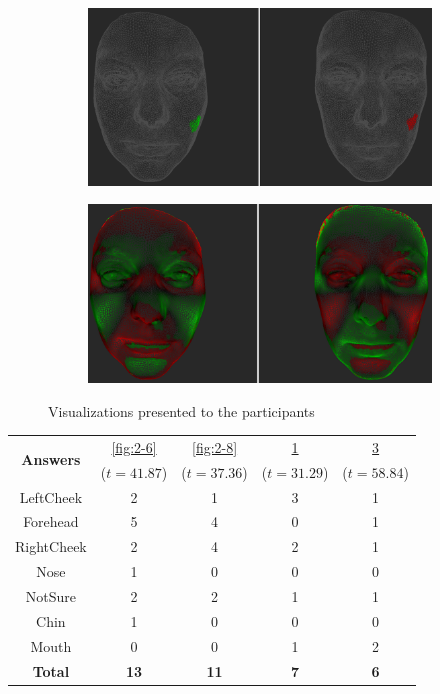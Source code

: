 \begin{figure}[h]
\begin{subfigure}{0.4\textwidth}
\includegraphics[width=\textwidth]{./screenshots/pair5.PNG}
\caption{}
\label{fig:2-5}
\end{subfigure}
\quad
\begin{subfigure}{0.4\textwidth}
\includegraphics[width=\textwidth]{./screenshots/pair7.PNG}
\caption{}
\label{fig:2-7}
\end{subfigure}
\caption{Visualizations presented to the participants}
\end{figure}
\medskip
\begin{center}
\begin{tabular}{| c | c | c | c | c |}
	\hline
\multirow{2}{*}{\bf Answers} & \ref{fig:2-6} & \ref{fig:2-8} & \ref{fig:2-5} & \ref{fig:2-7}\\
	&  (\(t=41.87\)) &  (\(t=37.36\)) &  (\(t=31.29\)) &  (\(t=58.84\))\\ \hline
	LeftCheek & 2 & 1 & 3 & 1\\ \hline
	Forehead & 5 & 4 & 0 & 1\\ \hline
	RightCheek & 2 & 4 & 2 & 1\\ \hline
	Nose & 1 & 0 & 0 & 0\\ \hline
	NotSure & 2 & 2 & 1 & 1\\ \hline
	Chin & 1 & 0 & 0 & 0\\ \hline
	Mouth & 0 & 0 & 1 & 2\\ \hline
	{\bf Total} & {\bf 13} & {\bf 11} & {\bf 7} & {\bf 6}\\ \hline
\end{tabular}
\end{center}
\clearpage

